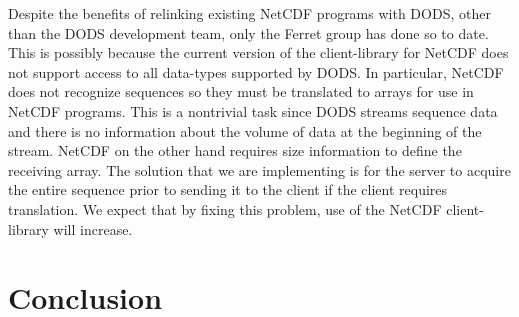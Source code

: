 \documentclass[12pt]{article}
\begin{document}
Despite the benefits of relinking existing \acs{NetCDF} 
programs with \acs{DODS}, other than the \acs{DODS} development team, 
only the Ferret group has done so to date. This is possibly because 
the current version of the client-library for \acs{NetCDF} does not 
support access to all data-types supported by \acs{DODS}. In particular, 
\acs{NetCDF} does not recognize sequences so they must be translated 
to arrays for use in \acs{NetCDF} programs. This is a nontrivial task
since \acs{DODS} streams sequence data and there is no information
about the volume of data at the beginning of the stream. \acs{NetCDF} 
on the other hand requires size information to define the receiving array. 
The solution that we are implementing is for the server to acquire the 
entire sequence prior to sending it to the client if the client requires 
translation. We expect that by fixing this problem, use of the \acs{NetCDF} 
client-library will increase. 

\section{Conclusion}
\label{conclusion}
\end{document}
